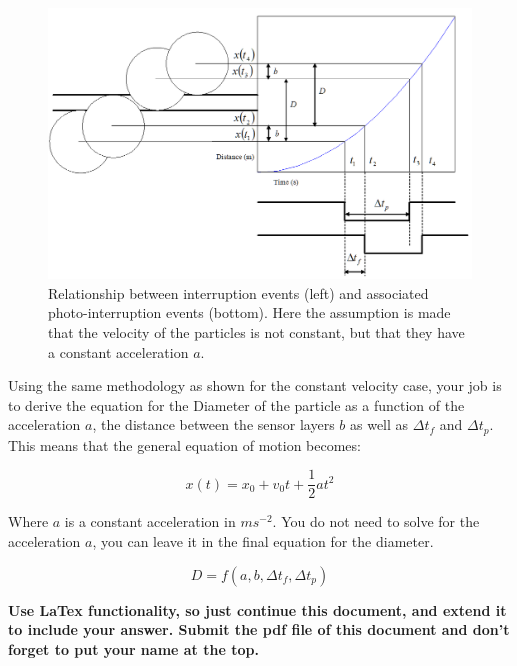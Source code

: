 \documentclass[11pt,letterpaper]{article}
\begin{document}
\begin{figure}
\centering
\includegraphics[width=0.8\linewidth]{HW_TimeOfFlightMeasurement3}
\caption{Relationship between interruption events (left) and associated photo-interruption events (bottom). Here the assumption is made that the velocity of the particles is not constant, but that they have a constant acceleration $a$.}
\label{fig:HW_TimeOfFlightMeasurement3}
\end{figure}

Using the same methodology as shown for the constant velocity case, your job is to derive the equation for the Diameter of the particle as a function of the acceleration $a$, the distance between the sensor layers $b$ as well as $\Delta t_f$ and $\Delta t_p$. This means that the general equation of motion becomes:

\begin{equation} \label{Eqn:HW_TimeOfFlightMeasurement6}
x(t) = x_0 + v_0t +\dfrac{1}{2}at^2
\end{equation}

Where $a$ is a constant acceleration in $ms^{-2}$. You do not need to solve for the acceleration $a$, you can leave it in the final equation for the diameter.

\begin{equation} \label{Eqn:HW_TimeOfFlightMeasurement7}
D=f(a,b,\Delta t_f, \Delta t_p)
\end{equation}

\textbf{Use LaTex functionality, so just continue this document, and extend it to include your answer. Submit the pdf file of this document and don't forget to put your name at the top.}
\end{document}
